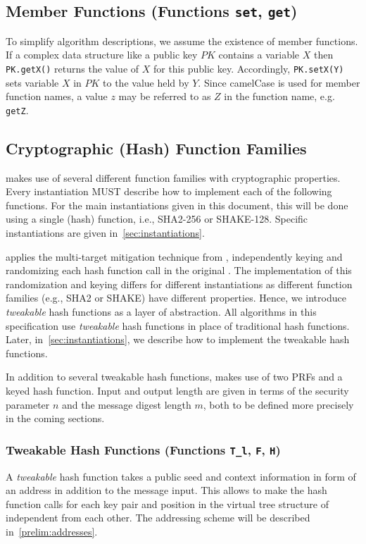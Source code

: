 \subsection{Member Functions (Functions \texttt{set}, \texttt{get})}\label{func:member}

   To simplify algorithm descriptions, we assume the existence of member
   functions.  If a complex data structure like a public key $PK$ contains
   a variable $X$ then \texttt{PK.getX()} returns the value of $X$ for this public key.
   Accordingly, \texttt{PK.setX(Y)} sets variable $X$ in $PK$ to the value held by
   $Y$.  Since camelCase is used for member function names, a value $z$ may
   be referred to as $Z$ in the function name, e.g.  \texttt{getZ}.

\subsection{Cryptographic (Hash) Function Families}
   \spx makes use of several different function families with cryptographic
   properties. Every \spx instantiation MUST describe how to implement each of
   the following functions. For the main instantiations given in this document,
   this will be done using a single (hash) function, i.e., SHA2-256 or SHAKE-128.
   Specific instantiations are given in~\autoref{sec:instantiations}.

   \spx applies the multi-target mitigation technique from
   \cite{Huelsing2016}, independently keying and randomizing each hash function
   call in the original \spc. The implementation of this randomization and
   keying differs for different instantiations as different function families
   (e.g., SHA2 or SHAKE) have different properties. Hence, we introduce
   \emph{tweakable} hash functions as a layer of abstraction. All algorithms in
   this specification use \emph{tweakable} hash functions in place of traditional
   hash functions. Later, in~\autoref{sec:instantiations}, we describe how to
   implement the tweakable hash functions.

   In addition to several tweakable hash functions, \spx makes use of two PRFs
   and a keyed hash function. Input and output length are given in terms of the
   security parameter $n$ and the message digest length $m$, both to be defined
   more precisely in the coming sections.

\subsubsection{Tweakable Hash Functions (Functions \texttt{T\_l}, \texttt{F}, \texttt{H})}
   A \emph{tweakable} hash function takes a public seed \pseed and context
   information in form of an address \adrs in addition to the message input.
   This allows to make the hash function calls for each
   key pair and position in the virtual tree structure of \spx independent from
   each other. The addressing scheme will be described in~\autoref{prelim:addresses}.

